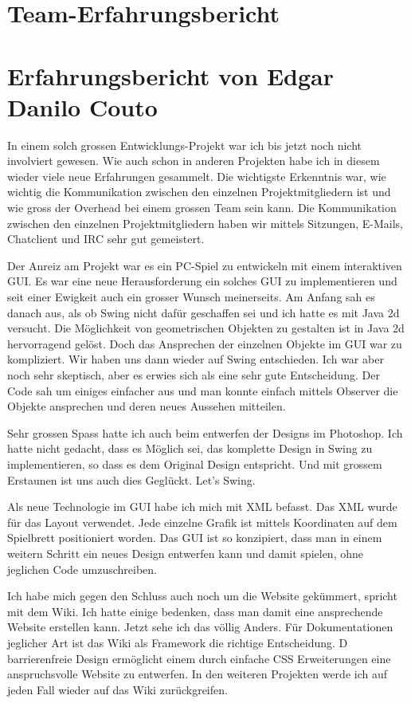 \documentclass[12pt,halfparskip]{scrartcl}
\begin{document}


\section{Team-Erfahrungsbericht}

\section{Erfahrungsbericht von Edgar Danilo Couto}
In einem solch grossen Entwicklungs-Projekt war ich bis jetzt noch nicht involviert gewesen. Wie auch schon in anderen Projekten habe ich in diesem wieder viele neue Erfahrungen gesammelt. Die wichtigste Erkenntnis war, wie wichtig die Kommunikation zwischen den einzelnen Projektmitgliedern ist und wie gross der Overhead bei einem grossen Team sein kann. Die Kommunikation zwischen den einzelnen Projektmitgliedern haben wir mittels Sitzungen, E-Mails, Chatclient und IRC sehr gut gemeistert.

Der Anreiz am Projekt war es ein PC-Spiel zu entwickeln mit einem interaktiven GUI. Es war eine neue Herausforderung ein solches GUI zu implementieren und seit einer Ewigkeit auch ein grosser Wunsch meinerseits. Am Anfang sah es danach aus, als ob Swing nicht dafür geschaffen sei und ich hatte es mit Java 2d versucht. Die Möglichkeit von geometrischen Objekten zu gestalten ist in Java 2d hervorragend gelöst. Doch das Ansprechen der einzelnen Objekte im GUI war zu kompliziert. Wir haben uns dann wieder auf  Swing entschieden. Ich war aber noch sehr skeptisch, aber es erwies sich als eine sehr gute Entscheidung. Der Code sah um einiges einfacher aus und man konnte einfach mittels Observer die Objekte ansprechen und deren neues Aussehen mitteilen. 

Sehr grossen Spass hatte ich auch beim entwerfen der Designs im Photoshop. Ich hatte nicht gedacht, dass es Möglich sei, das komplette Design in Swing zu implementieren, so dass es dem Original Design entspricht. Und mit grossem Erstaunen ist uns auch dies Geglückt. Let’s Swing. 

Als neue Technologie im GUI habe ich mich mit XML befasst. Das XML wurde für das Layout verwendet. Jede einzelne Grafik ist mittels Koordinaten auf dem Spielbrett positioniert worden. Das GUI ist so konzipiert, dass man in einem weitern Schritt ein neues Design entwerfen kann und damit spielen, ohne jeglichen Code umzuschreiben.

Ich habe mich gegen den Schluss auch noch um die Website gekümmert, spricht mit dem Wiki. Ich hatte einige bedenken, dass man damit eine ansprechende Website erstellen kann. Jetzt sehe ich das völlig Anders. Für Dokumentationen jeglicher Art ist das Wiki als Framework die richtige Entscheidung. D barrierenfreie Design ermöglicht einem durch einfache CSS Erweiterungen eine anspruchsvolle Website zu entwerfen. In den weiteren Projekten werde ich auf jeden Fall wieder auf das Wiki zurückgreifen.
\end{document}
